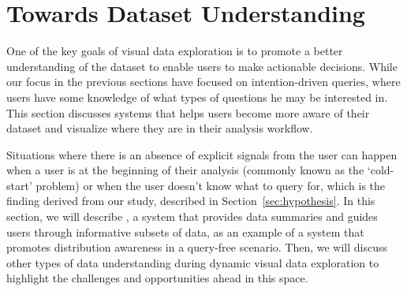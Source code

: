 \section{Towards Dataset Understanding\label{sec:understanding}}
\par One of the key goals of visual data exploration is to promote a better understanding of the dataset to enable users to make actionable decisions. While our focus in the previous sections have focused on intention-driven queries, where users have some knowledge of what types of questions he may be interested in. This section discusses systems that helps users become more aware of their dataset and visualize where they are in their analysis workflow. %
\par Situations where there is an absence of explicit signals from the user can happen when a user is at the beginning of their analysis (commonly known as the `cold-start' problem) or when the user doesn't know what to query for, which is the finding derived from our \zv study, described in Section~\ref{sec:hypothesis}. In this section, we will describe \sbd, a system that provides data summaries and guides users through informative subsets of data, as an example of a system that promotes distribution awareness in a query-free scenario. Then, we will discuss other types of data understanding during dynamic visual data exploration to highlight the challenges and opportunities ahead in this space.
